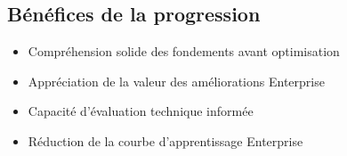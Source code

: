 \subsection{Bénéfices de la progression}

\begin{itemize}
    \item Compréhension solide des fondements avant optimisation
    \item Appréciation de la valeur des améliorations Enterprise
    \item Capacité d'évaluation technique informée
    \item Réduction de la courbe d'apprentissage Enterprise
\end{itemize}